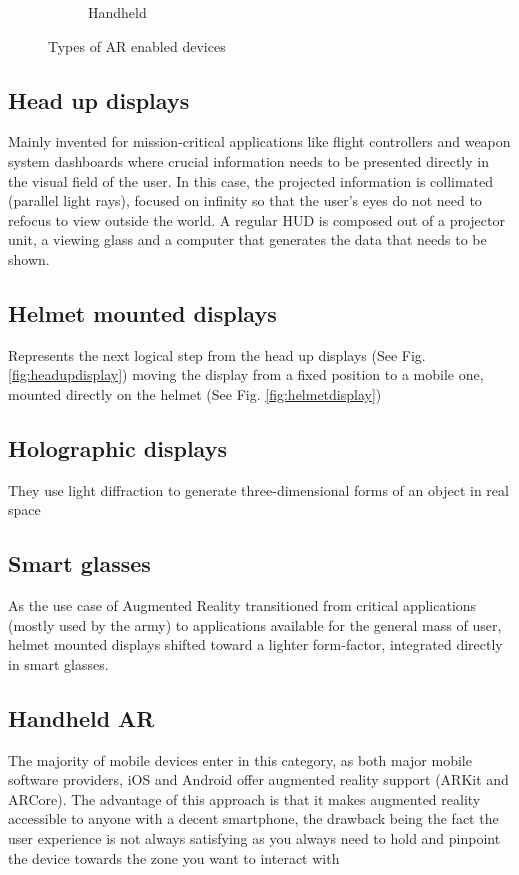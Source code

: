 \documentclass[12 pct]{report}
\begin{document}
\begin{figure}[h!]
\begin{subfigure}[b]{0.4\linewidth}
    \caption{Handheld}
  \end{subfigure}
  \caption{Types of AR enabled devices}
  \label{fig:artypes}
\end{figure}

\subsection*{Head up displays}
Mainly invented for mission-critical applications \cite{livingston2011military} like flight controllers and weapon system dashboards where crucial information needs to be presented directly in the visual field of the user. In this case, the projected information is collimated (parallel light rays), focused on infinity so that the user’s eyes do not need to refocus to view outside the world.
A regular HUD \cite{beckwith2015augmented} is composed out of a projector unit, a viewing glass and a computer that generates the data that needs to be shown.

\subsection*{Helmet mounted displays}
Represents the next logical step from the head up displays (See Fig. \ref{fig:headupdisplay}) moving the display from a fixed position to a mobile one, mounted directly on the helmet (See Fig. \ref{fig:helmetdisplay})

\subsection*{Holographic displays}
They use light diffraction \cite{lucente1997interactive} to generate three-dimensional forms of an object in real space

\subsection*{Smart glasses}
As the use case of Augmented Reality transitioned from critical applications (mostly used by the army) to applications available for the general mass of user, helmet mounted displays shifted toward a lighter form-factor, integrated directly in smart glasses. 

\subsection*{Handheld AR}
The majority of mobile devices enter in this category, as both major mobile software providers, iOS \cite{wilson2007iphone} and Android \cite{rogers2009android} offer augmented reality support (ARKit and ARCore). The advantage of this approach is that it makes augmented reality accessible to anyone with a decent smartphone, the drawback being the fact the user experience is not always satisfying as you always need to hold and pinpoint the device towards the zone you want to interact with
\end{document}
